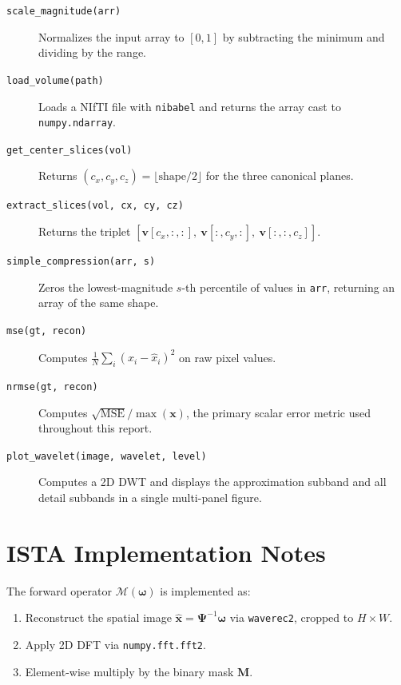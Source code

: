 \documentclass[10pt]{article}
\begin{document}
\begin{description}
  \item[\texttt{scale\_magnitude(arr)}] Normalizes the input array to $[0,1]$
  by subtracting the minimum and dividing by the range.

  \item[\texttt{load\_volume(path)}] Loads a NIfTI file with \texttt{nibabel}
  and returns the array cast to \texttt{numpy.ndarray}.

  \item[\texttt{get\_center\_slices(vol)}] Returns $(c_x, c_y, c_z) =
  \lfloor\mathrm{shape}/2\rfloor$ for the three canonical planes.

  \item[\texttt{extract\_slices(vol, cx, cy, cz)}] Returns the triplet
  $[\mathbf{v}[c_x,:,:],\ \mathbf{v}[:,c_y,:],\ \mathbf{v}[:,:,c_z]]$.

  \item[\texttt{simple\_compression(arr, s)}] Zeros the lowest-magnitude
  $s$-th percentile of values in \texttt{arr}, returning an array of the same
  shape.

  \item[\texttt{mse(gt, recon)}] Computes $\frac{1}{N}\sum_i (x_i -
  \hat{x}_i)^2$ on raw pixel values.

  \item[\texttt{nrmse(gt, recon)}] Computes $\sqrt{\mathrm{MSE}}/\max(\mathbf{x})$,
  the primary scalar error metric used throughout this report.

  \item[\texttt{plot\_wavelet(image, wavelet, level)}] Computes a 2D DWT and displays the approximation subband and all detail subbands in a single multi-panel figure.
\end{description}

\section{ISTA Implementation Notes}
\label{app:ista}

The forward operator $\mathcal{M}(\boldsymbol{\omega})$ is implemented as:
\begin{enumerate}
  \item Reconstruct the spatial image $\hat{\mathbf{x}} =
  \boldsymbol{\Psi}^{-1}\boldsymbol{\omega}$ via \texttt{waverec2}, cropped
  to $H\times W$.
  \item Apply 2D DFT via \texttt{numpy.fft.fft2}.
  \item Element-wise multiply by the binary mask $\mathbf{M}$.
\end{enumerate}
\end{document}
